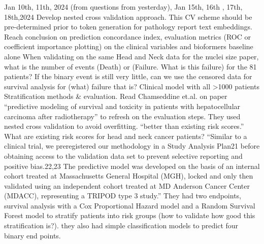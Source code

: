 \documentclass{article}%
\begin{document}
\newline%
\newline%
%
Jan 10th, 11th, 2024 (from questions from yesterday), Jan 15th, 16th , 17th, 18th,2024 %
\newline%
\newline%
%
Develop nested cross validation approach. %
\newline%
\newline%
%
This CV scheme should be pre{-}determined prior to token generation for pathology report text embeddings. %
\newline%
\newline%
%
Reach conclusion on prediction concordance index, evaluation metrics (ROC or coefficient importance plotting) on the clinical variables and bioformers baseline alone%
\newline%
\newline%
%
When validating on the same Head and Neck data for the nuclei size paper, what is the number of events (Death) or (Failure. What is this failure) for the 81 patients? If the binary event is still very little, can we use the censored data for survival analysis for (what) failure that is? %
\newline%
\newline%
%
Clinical model with all >1000 patients %
\newline%
\newline%
%
Stratification methods \& evaluation. Read Chamseddine et.al. on paper “predictive modeling of survival and toxicity in patients with hepatocellular carcinoma after radiotherapy” to refresh on the evaluation steps. They used nested cross validation to avoid overfitting. “better than existing risk scores.” What are existing risk scores for head and neck cancer patients? %
\newline%
\newline%
%
“Similar to a clinical trial, we preregistered our methodology in a Study Analysis Plan21 before obtaining access to the validation data set to prevent selective reporting and positive bias.22,23 The predictive model was developed on the basis of an internal cohort treated at Massachusetts General Hospital (MGH), locked and only then validated using an independent cohort treated at MD Anderson Cancer Center (MDACC), representing a TRIPOD type 3 study.”%
\newline%
\newline%
%
They had two endpoints, survival analysis with a Cox Proportional Hazard model and a Random Survival Forest model to stratify patients into risk groups (how to validate how good this stratification is?). they also had simple classification models to predict four binary end points. %
\end{document}
